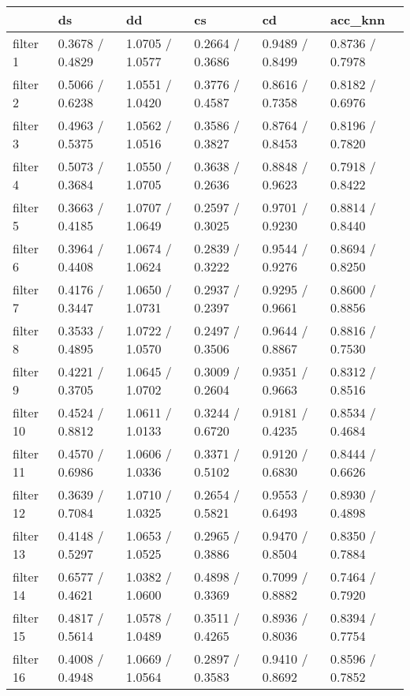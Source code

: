 \begin{tabular}{llllll}
\toprule
{} &               ds &               dd &               cs &               cd &          acc\_knn \\
\midrule
filter 1  &  0.3678 / 0.4829 &  1.0705 / 1.0577 &  0.2664 / 0.3686 &  0.9489 / 0.8499 &  0.8736 / 0.7978 \\
filter 2  &  0.5066 / 0.6238 &  1.0551 / 1.0420 &  0.3776 / 0.4587 &  0.8616 / 0.7358 &  0.8182 / 0.6976 \\
filter 3  &  0.4963 / 0.5375 &  1.0562 / 1.0516 &  0.3586 / 0.3827 &  0.8764 / 0.8453 &  0.8196 / 0.7820 \\
filter 4  &  0.5073 / 0.3684 &  1.0550 / 1.0705 &  0.3638 / 0.2636 &  0.8848 / 0.9623 &  0.7918 / 0.8422 \\
filter 5  &  0.3663 / 0.4185 &  1.0707 / 1.0649 &  0.2597 / 0.3025 &  0.9701 / 0.9230 &  0.8814 / 0.8440 \\
filter 6  &  0.3964 / 0.4408 &  1.0674 / 1.0624 &  0.2839 / 0.3222 &  0.9544 / 0.9276 &  0.8694 / 0.8250 \\
filter 7  &  0.4176 / 0.3447 &  1.0650 / 1.0731 &  0.2937 / 0.2397 &  0.9295 / 0.9661 &  0.8600 / 0.8856 \\
filter 8  &  0.3533 / 0.4895 &  1.0722 / 1.0570 &  0.2497 / 0.3506 &  0.9644 / 0.8867 &  0.8816 / 0.7530 \\
filter 9  &  0.4221 / 0.3705 &  1.0645 / 1.0702 &  0.3009 / 0.2604 &  0.9351 / 0.9663 &  0.8312 / 0.8516 \\
filter 10 &  0.4524 / 0.8812 &  1.0611 / 1.0133 &  0.3244 / 0.6720 &  0.9181 / 0.4235 &  0.8534 / 0.4684 \\
filter 11 &  0.4570 / 0.6986 &  1.0606 / 1.0336 &  0.3371 / 0.5102 &  0.9120 / 0.6830 &  0.8444 / 0.6626 \\
filter 12 &  0.3639 / 0.7084 &  1.0710 / 1.0325 &  0.2654 / 0.5821 &  0.9553 / 0.6493 &  0.8930 / 0.4898 \\
filter 13 &  0.4148 / 0.5297 &  1.0653 / 1.0525 &  0.2965 / 0.3886 &  0.9470 / 0.8504 &  0.8350 / 0.7884 \\
filter 14 &  0.6577 / 0.4621 &  1.0382 / 1.0600 &  0.4898 / 0.3369 &  0.7099 / 0.8882 &  0.7464 / 0.7920 \\
filter 15 &  0.4817 / 0.5614 &  1.0578 / 1.0489 &  0.3511 / 0.4265 &  0.8936 / 0.8036 &  0.8394 / 0.7754 \\
filter 16 &  0.4008 / 0.4948 &  1.0669 / 1.0564 &  0.2897 / 0.3583 &  0.9410 / 0.8692 &  0.8596 / 0.7852 \\
\bottomrule
\end{tabular}

